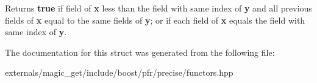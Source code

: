 \begin{DoxyReturn}{Returns}
{\bfseries true} if field of {\bfseries x} less than the field with same index of {\bfseries y} and all previous fields of {\bfseries x} equal to the same fields of {\bfseries y}; or if each field of {\bfseries x} equals the field with same index of {\bfseries y}.
\end{DoxyReturn}


The documentation for this struct was generated from the following file\+:\begin{DoxyCompactItemize}
\item 
externals/magic\+\_\+get/include/boost/pfr/precise/functors.\+hpp\end{DoxyCompactItemize}
